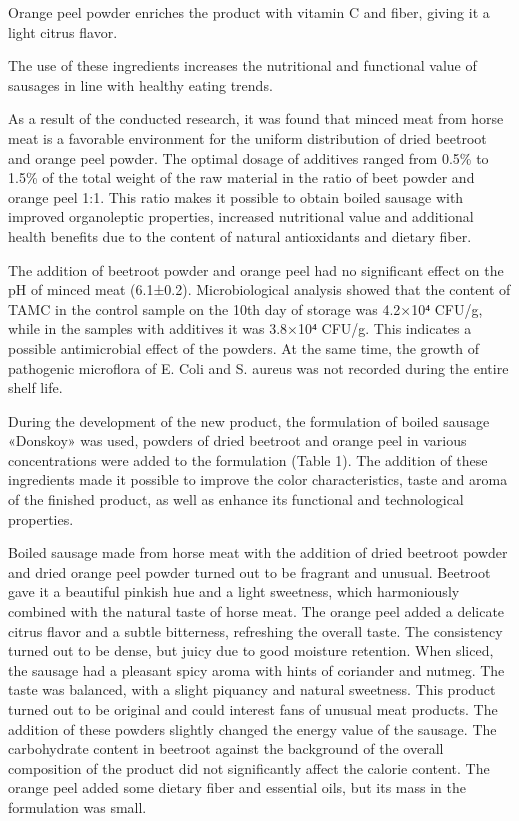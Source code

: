\begin{multicols}{2}
Orange peel powder enriches the product with vitamin C and fiber, giving
it a light citrus flavor.

The use of these ingredients increases the nutritional and functional
value of sausages in line with healthy eating trends.

As a result of the conducted research, it was found that minced meat
from horse meat is a favorable environment for the uniform distribution
of dried beetroot and orange peel powder. The optimal dosage of
additives ranged from 0.5\% to 1.5\% of the total weight of the raw
material in the ratio of beet powder and orange peel 1:1. This ratio
makes it possible to obtain boiled sausage with improved organoleptic
properties, increased nutritional value and additional health benefits
due to the content of natural antioxidants and dietary fiber.

The addition of beetroot powder and orange peel had no significant
effect on the pH of minced meat (6.1±0.2). Microbiological analysis
showed that the content of TAMC in the control sample on the 10th day of
storage was 4.2×10⁴ CFU/g, while in the samples with additives it was
3.8×10⁴ CFU/g. This indicates a possible antimicrobial effect of the
powders. At the same time, the growth of pathogenic microflora of E.
Coli and S. aureus was not recorded during the entire shelf life.

During the development of the new product, the formulation of boiled
sausage «Donskoy» was used, powders of dried beetroot and orange peel in
various concentrations were added to the formulation (Table 1). The
addition of these ingredients made it possible to improve the color
characteristics, taste and aroma of the finished product, as well as
enhance its functional and technological properties.

Boiled sausage made from horse meat with the addition of dried beetroot
powder and dried orange peel powder turned out to be fragrant and
unusual. Beetroot gave it a beautiful pinkish hue and a light sweetness,
which harmoniously combined with the natural taste of horse meat. The
orange peel added a delicate citrus flavor and a subtle bitterness,
refreshing the overall taste. The consistency turned out to be dense,
but juicy due to good moisture retention. When sliced, the sausage had a
pleasant spicy aroma with hints of coriander and nutmeg. The taste was
balanced, with a slight piquancy and natural sweetness. This product
turned out to be original and could interest fans of unusual meat
products. The addition of these powders slightly changed the energy
value of the sausage. The carbohydrate content in beetroot against the
background of the overall composition of the product did not
significantly affect the calorie content. The orange peel added some
dietary fiber and essential oils, but its mass in the formulation was
small.


\end{multicols}
